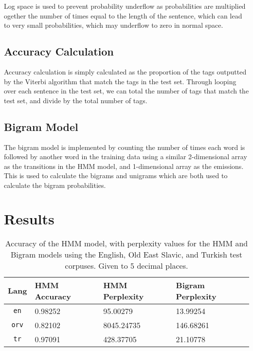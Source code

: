 \documentclass[a4paper, 12pt]{article}
\begin{document}
Log space is used to prevent probability underflow as probabilities are multiplied ogether the number of times equal to the length of the sentence, which can lead to very small probabilities, which may underflow to zero in normal space.

\subsection{Accuracy Calculation}

Accuracy calculation is simply calculated as the proportion of the tags outputted by the Viterbi algorithm that match the tags in the test set. Through looping over each sentence in the test set, we can total the number of tags that match the test set, and divide by the total number of tags.

\subsection{Bigram Model}

The bigram model is implemented by counting the number of times each word is followed by another word in the training data using a similar 2-dimensional array as the transitions in the HMM model, and 1-dimensional array as the emissions. This is used to calculate the bigrams and unigrams which are both used to calculate the bigram probabilities.

\pagebreak
\section{Results}

\begin{table}[H]
    \centering
    \begin{tabular}{c | l | l | l}
        \textbf{Lang}   & \textbf{HMM Accuracy} & \textbf{HMM Perplexity}   & \textbf{Bigram Perplexity}\\
        \hline
        \texttt{en}     & 0.98252               & 95.00279                  & 13.99254                  \\
        \hline
        \texttt{orv}    & 0.82102               & 8045.24735                & 146.68261                 \\
        \hline
        \texttt{tr}     & 0.97091               & 428.37705                 & 21.10778                  \\
    \end{tabular}
    \caption{Accuracy of the HMM model, with perplexity values for the HMM and Bigram models using the English, Old East Slavic, and Turkish test corpuses. Given to 5 decimal places.}
    \label{tab:hmm-accuracy}
\end{table}
\end{document}
